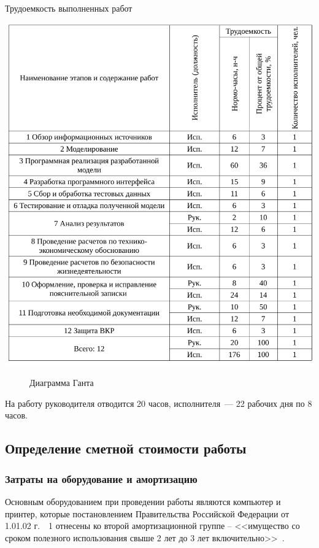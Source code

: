\begin{table}[ht!]
\caption{Трудоемкость выполненных работ}
\centering
\includegraphics[page=1, width=1\linewidth]{tables/economics/schedule.pdf}
\label{tab:job_is_done_1}
\end{table}


\clearpage
\begin{figure}[h!]
\caption{ Диаграмма Ганта }
\label{grantt:grantt}
\end{figure}


На работу руководителя отводится 20 часов, исполнителя~--- 22 рабочих дня по 8 часов.

\subsection{Определение сметной стоимости работы}
\subsubsection{Затраты на оборудование и амортизацию}

Основным оборудованием при проведении работы являются компьютер и принтер, которые 
постановлением Правительства Российской Федерации от 1.01.02 г.~\textnumero~1 отнесены ко второй амортизационной группе – 
<<имущество со сроком полезного использования свыше 2 лет до 3 лет включительно>>~\cite{amort}. 

